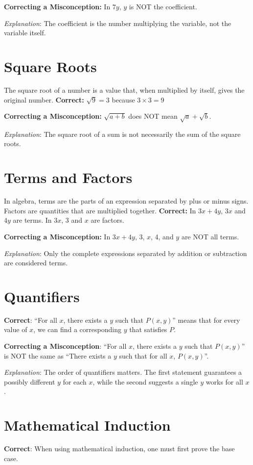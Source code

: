 \documentclass[12pt]{article}
\begin{document}
\textbf{Correcting a Misconception:} In \(7y\), \(y\) is NOT the coefficient.

\textit{Explanation}: The coefficient is the number multiplying the variable, not the variable itself.

\section*{Square Roots}
The square root of a number is a value that, when multiplied by itself, gives the original number.
\textbf{Correct:} \(\sqrt{9} = 3\) because \(3 \times 3 = 9\)

\textbf{Correcting a Misconception:} \(\sqrt{a + b}\) does NOT mean \(\sqrt{a} + \sqrt{b}\).

\textit{Explanation}: The square root of a sum is not necessarily the sum of the square roots.

\section*{Terms and Factors}
In algebra, terms are the parts of an expression separated by plus or minus signs. Factors are quantities that are multiplied together.
\textbf{Correct:} In \(3x + 4y\), \(3x\) and \(4y\) are terms. In \(3x\), 3 and \(x\) are factors.

\textbf{Correcting a Misconception:} In \(3x + 4y\), 3, \(x\), 4, and \(y\) are NOT all terms.

\textit{Explanation}: Only the complete expressions separated by addition or subtraction are considered terms.

\section*{Quantifiers}
\textbf{Correct}: ``For all \(x\), there exists a \(y\) such that \(P(x,y)\)'' means that for every value of \(x\), we can find a corresponding \(y\) that satisfies \(P\).

\textbf{Correcting a Misconception}: ``For all \(x\), there exists a \(y\) such that \(P(x,y)\)'' is NOT the same as ``There exists a \(y\) such that for all \(x\), \(P(x,y)\)''.

\textit{Explanation}: The order of quantifiers matters. The first statement guarantees a possibly different \(y\) for each \(x\), while the second suggests a single \(y\) works for all \(x\).

\section*{Mathematical Induction}
\textbf{Correct}: When using mathematical induction, one must first prove the base case.
\end{document}
